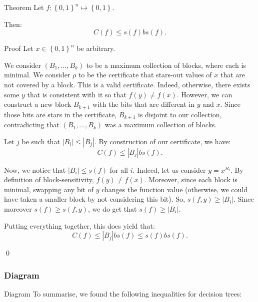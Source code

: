 \documentclass[a4paper]{article}
\begin{document}
\begin{parag}{Theorem}
    Let $f: \left\{0, 1\right\}^n \mapsto \left\{0, 1\right\}$.

    Then: 
    \[C\left(f\right) \leq s\left(f\right) bs\left(f\right).\]

    \begin{subparag}{Proof}
        Let $x \in \left\{0, 1\right\}^n$ be arbitrary. 

        We consider $\left(B_1, \ldots, B_k\right)$ to be a maximum collection of blocks, where each is minimal. We consider $\rho$ to be the certificate that stars-out values of $x$ that are not covered by a block. This is a valid certificate. Indeed, otherwise, there exists some $y$ that is consistent with it so that $f\left(y\right) \neq f\left(x\right)$. However, we can construct a new block $B_{k+1}$ with the bits that are different in $y$ and $x$. Since those bits are stars in the certificate, $B_{k+1}$ is disjoint to our collection, contradicting that $\left(B_1, \ldots, B_k\right)$ was a maximum collection of blocks.

        Let $j$ be such that $\left|B_i\right| \leq \left|B_j\right|$. By construction of our certificate, we have:
        \[C\left(f\right) \leq \left|B_j\right| bs\left(f\right).\]

        Now, we notice that $\left|B_i\right| \leq s\left(f\right)$ for all $i$. Indeed, let us consider $y = x^{B_i}$. By definition of block-sensitivity, $f\left(y\right) \neq f\left(x\right)$. Moreover, since each block is minimal, swapping any bit of $y$ changes the function value (otherwise, we could have taken a smaller block by not considering this bit). So, $s\left(f, y\right) \geq \left|B_i\right|$. Since moreover $s\left(f\right) \geq s\left(f, y\right)$, we do get that $s\left(f\right) \geq \left|B_i\right|$.

        Putting everything together, this does yield that:
        \[C\left(f\right) \leq \left|B_j\right| bs\left(f\right) \leq s\left(f\right) bs\left(f\right).\]

        \qed
    \end{subparag}
\end{parag}

\subsubsection{Diagram}

\begin{parag}{Diagram}
    To summarise, we found the following inequalities for decision trees:
\end{parag}
\end{document}
